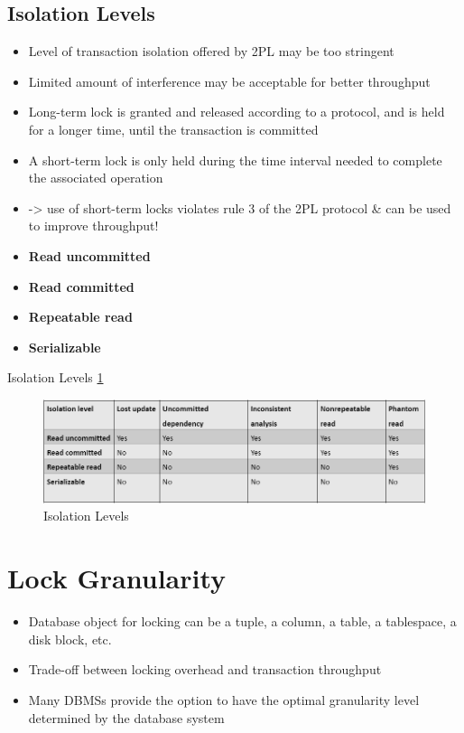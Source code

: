 \documentclass{report}
\begin{document}
    \subsection{Isolation Levels}
    \begin{itemize}
        \item Level of transaction isolation offered by 2PL may be too stringent
        \item Limited amount of interference may be acceptable for better throughput
        \item Long-term lock is granted and released according to a protocol, and is held for a longer time, until the transaction is committed
        \item A short-term lock is only held during the time interval needed to complete the associated operation
        \item -> use of short-term locks violates rule 3 of the 2PL protocol \& can be used to improve throughput!
        \item \textbf{Read uncommitted}
        \item \textbf{Read committed}
        \item \textbf{Repeatable read}
        \item \textbf{Serializable}        
    \end{itemize}
    Isolation Levels \ref{fig:isolation-levels}
    \begin{figure}
        \includegraphics[width=350pt]{./images/isolation-levels.png}
        \caption{\label{fig:isolation-levels}Isolation Levels}
    \end{figure}
    \section{Lock Granularity}
    \begin{itemize}
        \item Database object for locking can be a tuple, a column, a table, a tablespace, a disk block, etc.
        \item Trade-off between locking overhead and transaction throughput
        \item Many DBMSs provide the option to have the optimal granularity level determined by the database system
    \end{itemize}
\end{document}
